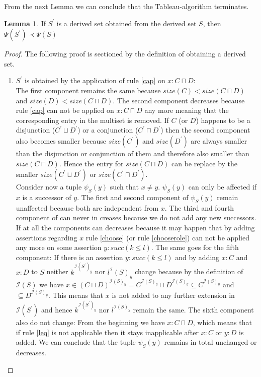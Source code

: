 \documentclass[a4paper,11pt]{scrartcl}
\theoremstyle{break}
\theoremstyle{definition}
\newtheorem{mylem}{Lemma}
\begin{document}
From the next Lemma we can conclude that the Tableau-algorithm terminates.
\begin{mylem}
If $S^\prime$ is a derived set obtained from the derived set $S$, then $\Psi(S^\prime)\prec\Psi(S)$
\end{mylem}
\begin{proof}
The following proof is sectioned by the definition of obtaining a derived set.
\begin{enumerate}
\item $S^\prime$ is obtained by the application of rule \ref{cap} on $x:C\sqcap D$:\\
The first component remains the same because $size(C)<size(C\sqcap D)$ and $size(D)<size(C\sqcap D)$. The second component decreases because rule \ref{cap} can not be applied on $x:C\sqcap D$ any more meaning that the corresponding entry in the multiset is removed. If $C$ (or $D$) happens to be a disjunction ($C^\prime\sqcup D^\prime$) or a conjunction ($C^\prime\sqcap D^\prime$) then the second component also becomes smaller because $size(C^\prime)$ and $size(D^\prime)$ are always smaller than the disjunction or conjunction of them and therefore also smaller than $size(C\sqcap D)$. Hence the entry for $size(C\sqcap D)$ can be replace by the smaller $size(C^\prime\sqcup D^\prime)$ or $size(C^\prime\sqcap D^\prime)$.\\
Consider now a tuple $\psi_S(y)$ such that $x\neq y$. $\psi_S(y)$ can only be affected if $x$ is a successor of $y$. The first and second component of $\psi_S(y)$ remain unaffected because both are independent from $x$. The third and fourth component of can never in creases because we do not add any new successors. If at all the components can decreases because it may happen that by adding assertions regarding $x$ rule \ref{choose} (or rule \ref{chooserole}) can not be applied any more on some assertion $y:succ(k\leq l)$. The same goes for the fifth component: If there is an assertion $y:succ(k\leq l)$ and by adding $x:C$ and $x:D$ to $S$ neither $k^{\mathcal{I}(S^\prime)_y}$ nor $l^\mathcal{I}(S)_y$ change because by the definition of $\mathcal{I}(S)$ we have $x\in (C\sqcap D)^{\mathcal{I}(S)_y}=C^{\mathcal{I}(S)_y}\sqcap D^{\mathcal{I}(S)_y}\subseteq C^{\mathcal{I}(S)_y}$ and $\subseteq D^{\mathcal{I}(S)_y}$. This means that $x$ is not added to any further extension in $\mathcal{I}(S^\prime)$ and hence $k^{\mathcal{I}(S^\prime)_y}$ nor $l^{\mathcal{I}(S)_y}$ remain the same. The sixth component also do not change: From the beginning we have $x:C\sqcap D$, which means that if rule \ref{leq} is not applicable then it stays inapplicable after $x:C$ or $y:D$ is added. We can conclude that the tuple $\psi_S(y)$ remains in total unchanged or decreases.\\

\end{enumerate}
\end{proof}
\end{document}

